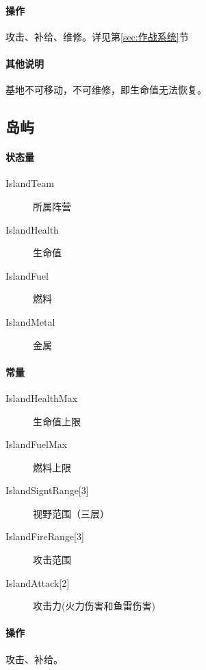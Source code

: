 \documentclass[11pt,a4paper]{article}
\begin{document}
      \paragraph{操作} 攻击、补给、维修。详见第\ref{sec:作战系统}节
      \paragraph{其他说明} 基地不可移动，不可维修，即生命值无法恢复。


    \subsection{岛屿}
      \paragraph{状态量}
        \begin{minipage}[t]{0.6\textwidth}
          \begin{description}
            \item[IslandTeam] 所属阵营
            \item[IslandHealth] 生命值
            \item[IslandFuel] 燃料
            \item[IslandMetal] 金属
          \end{description}
        \end{minipage}

      \paragraph{常量}
        \begin{minipage}[t]{0.6\textwidth}
          \begin{description}
            \item[IslandHealthMax] 生命值上限
            \item[IslandFuelMax] 燃料上限
            \item[{IslandSigntRange[3]}] 视野范围（三层）
            \item[{IslandFireRange[3]}] 攻击范围
            \item[{IslandAttack[2]}] 攻击力(火力伤害和鱼雷伤害)
          \end{description}
        \end{minipage}

      \paragraph{操作} 攻击、补给。
\end{document}
